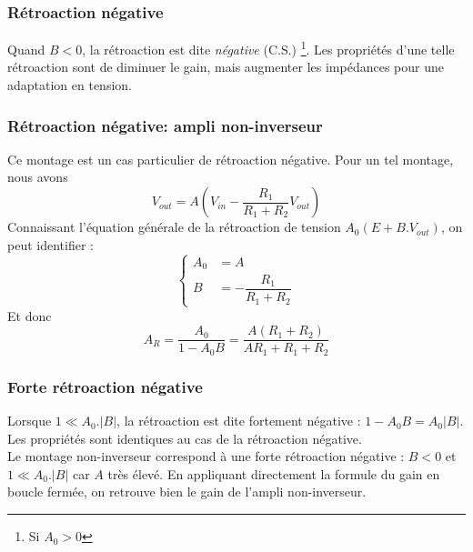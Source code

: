 		
		\subsubsection{Rétroaction négative}
		Quand $B<0$, la rétroaction est dite \textit{négative} (C.S.)
		\footnote{Si $A_0>0$}. Les propriétés d'une telle rétroaction 
		sont de diminuer le gain, mais augmenter les impédances pour 
		une adaptation en tension.
	
	
		\subsubsection{Rétroaction négative: ampli non-inverseur}
		Ce montage est un cas particulier de rétroaction négative. 
		Pour un tel montage, nous avons 
		\begin{equation}
		V_{out} = A\left(V_{in}-\dfrac{R_1}{R_1+R_2}V_{out}\right)
		\end{equation}
		Connaissant l'équation générale de la rétroaction de 
		tension $A_0(E+B.V_{out})$, on peut identifier :
		\begin{equation}
		\left\{\begin{array}{ll}
		A_0 &= A\\
		B &= -\dfrac{R_1}{R_1+R_2}
		\end{array}\right.
		\end{equation}
		Et donc
		\begin{equation}
		A_R = \dfrac{A_0}{1-A_0B} = \dfrac{A(R_1+R_2)}{AR_1+R_1+R_2}
		\end{equation}
		
		\subsubsection{Forte rétroaction négative}
		Lorsque $1\ll A_0.|B|$, la rétroaction est dite fortement 
		négative : $1-A_0B = A_0|B|$. Les propriétés sont identiques 
		au cas de la rétroaction négative.\\
		Le montage non-inverseur correspond à une forte rétroaction 
		négative : $B <0$ et $1\ll A_0.|B|$ car $A$ très élevé. En 
		appliquant directement la formule du gain en boucle fermée, 
		on retrouve bien le gain de l'ampli non-inverseur.
		
